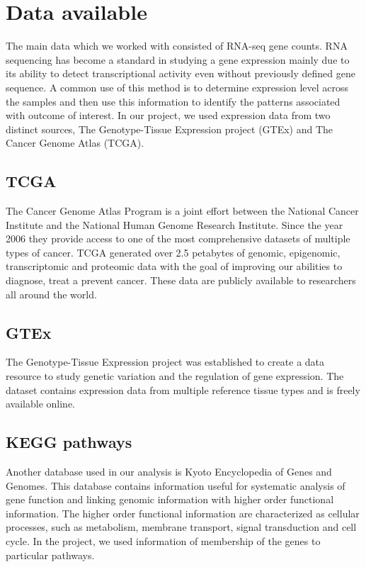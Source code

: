 \section{Data available}
The main data which we worked with consisted of RNA-seq gene counts.
RNA sequencing has become a standard in studying a gene expression mainly due to its ability to detect transcriptional activity even without previously defined gene sequence. \cite{nellore2016rail}
A common use of this method is to determine expression level across the samples and then use this information to identify the patterns associated with outcome of interest.
In our project, we used expression data from two distinct sources, The Genotype-Tissue Expression project (GTEx) and The Cancer Genome Atlas (TCGA).\cite{lonsdale2013genotype, tcga}

\subsection{TCGA}
The Cancer Genome Atlas Program is a joint effort between the National Cancer Institute and the National Human Genome Research Institute.
Since the year 2006 they provide access to one of the most comprehensive datasets of multiple types of cancer.
TCGA generated over 2.5 petabytes of genomic, epigenomic, transcriptomic and proteomic data with the goal of improving our abilities to diagnose, treat a prevent cancer.
These data are publicly available to researchers all around the world.

\subsection{GTEx}
The Genotype-Tissue Expression project was established to create a data resource to study genetic variation and the regulation of gene expression.
The dataset contains expression data from multiple reference tissue types and is freely available online.

\subsection{KEGG pathways}
Another database used in our analysis is Kyoto Encyclopedia of Genes and Genomes. \cite{kanehisa2000kegg}
This database contains information useful for systematic analysis of gene function and linking genomic information with higher order functional information.
The higher order functional information are characterized as cellular processes, such as metabolism, membrane transport, signal transduction and cell cycle.
In the project, we used information of membership of the genes to particular pathways.
\label{subsec:kegg}

